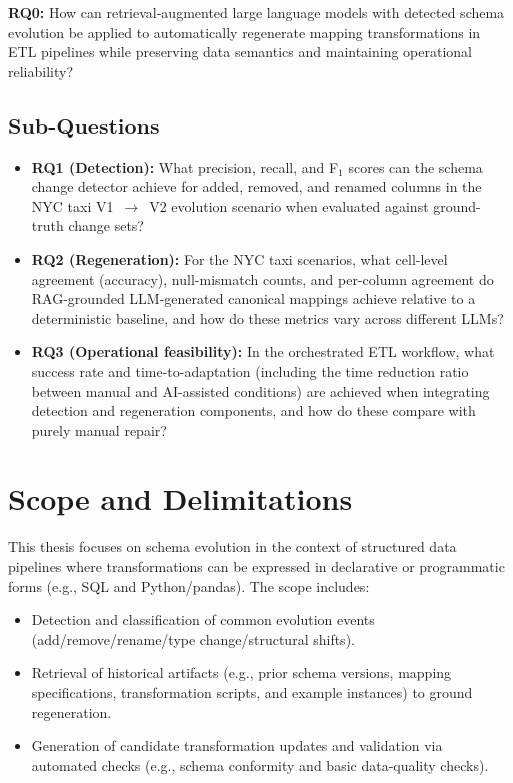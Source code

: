 \textbf{RQ0:} How can retrieval-augmented large language models with detected schema evolution be applied to automatically regenerate mapping transformations in ETL pipelines while preserving data semantics and maintaining operational reliability?

\subsection{Sub-Questions}

\begin{itemize}
  \item \textbf{RQ1 (Detection):} What precision, recall, and F\(_1\) scores can the schema change detector achieve for added, removed, and renamed columns in the NYC taxi V1~\(\rightarrow\)~V2 evolution scenario when evaluated against ground-truth change sets?
  \item \textbf{RQ2 (Regeneration):} For the NYC taxi scenarios, what cell-level agreement (accuracy), null-mismatch counts, and per-column agreement do RAG-grounded LLM-generated canonical mappings achieve relative to a deterministic baseline, and how do these metrics vary across different LLMs?
  \item \textbf{RQ3 (Operational feasibility):} In the orchestrated ETL workflow, what success rate and time-to-adaptation (including the time reduction ratio between manual and AI-assisted conditions) are achieved when integrating detection and regeneration components, and how do these compare with purely manual repair?
\end{itemize}

\section{Scope and Delimitations}
\label{sec:intro-scope}

This thesis focuses on schema evolution in the context of structured data pipelines where transformations can be expressed in declarative or programmatic forms (e.g., SQL and Python/pandas). The scope includes:
\begin{itemize}
  \item Detection and classification of common evolution events (add/remove/rename/type change/structural shifts).
  \item Retrieval of historical artifacts (e.g., prior schema versions, mapping specifications, transformation scripts, and example instances) to ground regeneration.
  \item Generation of candidate transformation updates and validation via automated checks (e.g., schema conformity and basic data-quality checks).
\end{itemize}

